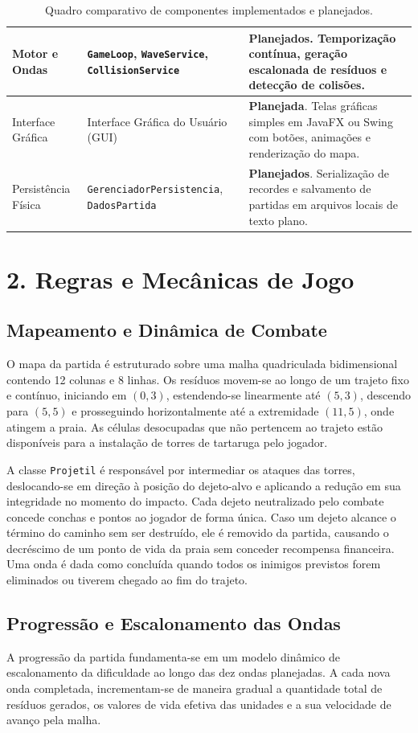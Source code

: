 \documentclass[11pt,a4paper]{article}
\begin{document}
\begin{table}[h!]
\begin{tabularx}{\textwidth}{|p{}|p{}|X|}
\hline
Motor e Ondas & \texttt{GameLoop}, \texttt{WaveService}, \texttt{CollisionService} & \textbf{Planejados}. Temporização contínua, geração escalonada de resíduos e detecção de colisões. \\
\hline
Interface Gráfica & Interface Gráfica do Usuário (GUI) & \textbf{Planejada}. Telas gráficas simples em JavaFX ou Swing com botões, animações e renderização do mapa. \\
\hline
Persistência Física & \texttt{GerenciadorPersistencia}, \texttt{DadosPartida} & \textbf{Planejados}. Serialização de recordes e salvamento de partidas em arquivos locais de texto plano. \\
\hline
\end{tabularx}
\caption{Quadro comparativo de componentes implementados e planejados.}
\label{tab:status}
\end{table}

\clearpage
\section*{2. Regras e Mecânicas de Jogo}
\subsection*{Mapeamento e Dinâmica de Combate}
O mapa da partida é estruturado sobre uma malha quadriculada bidimensional contendo 12 colunas e 8 linhas. Os resíduos movem-se ao longo de um trajeto fixo e contínuo, iniciando em $(0,3)$, estendendo-se linearmente até $(5,3)$, descendo para $(5,5)$ e prosseguindo horizontalmente até a extremidade $(11,5)$, onde atingem a praia. As células desocupadas que não pertencem ao trajeto estão disponíveis para a instalação de torres de tartaruga pelo jogador.

A classe \texttt{Projetil} é responsável por intermediar os ataques das torres, deslocando-se em direção à posição do dejeto-alvo e aplicando a redução em sua integridade no momento do impacto. Cada dejeto neutralizado pelo combate concede conchas e pontos ao jogador de forma única. Caso um dejeto alcance o término do caminho sem ser destruído, ele é removido da partida, causando o decréscimo de um ponto de vida da praia sem conceder recompensa financeira. Uma onda é dada como concluída quando todos os inimigos previstos forem eliminados ou tiverem chegado ao fim do trajeto.

\subsection*{Progressão e Escalonamento das Ondas}
A progressão da partida fundamenta-se em um modelo dinâmico de escalonamento da dificuldade ao longo das dez ondas planejadas. A cada nova onda completada, incrementam-se de maneira gradual a quantidade total de resíduos gerados, os valores de vida efetiva das unidades e a sua velocidade de avanço pela malha. 
\end{document}
